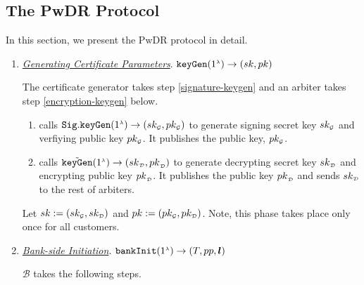 




\subsection{The PwDR Protocol}
In this section, we present the PwDR protocol in detail. 





\begin{enumerate}

\item \underline{\textit{Generating  Certificate Parameters}}.  $\mathtt{keyGen}(1^{\scriptscriptstyle \lambda})\rightarrow (sk,pk)$

The certificate generator  takes   step \ref{signature-keygen} and an arbiter takes step \ref{encryption-keygen} below. 

\begin{enumerate}
\item\label{signature-keygen} calls $\mathtt{Sig.keyGen}(1^{\scriptscriptstyle \lambda})\rightarrow (sk_{\scriptscriptstyle\mathcal{G}}, pk_{\scriptscriptstyle\mathcal{G}})$ to generate  signing secret key $sk_{\scriptscriptstyle\mathcal{G}}$ and  verfiying public key $pk_{\scriptscriptstyle\mathcal{G}}$. It publishes the public key, $pk_{\scriptscriptstyle\mathcal{G}}$.
%
\item\label{encryption-keygen} calls $\tilde{\mathtt{keyGen}}(1^{\scriptscriptstyle\lambda})\rightarrow({sk}_{\scriptscriptstyle\mathcal {D}}, {pk}_{\scriptscriptstyle\mathcal {D}})$ to generate  decrypting secret key ${sk}_{\scriptscriptstyle\mathcal {D}}$ and encrypting public key ${pk}_{\scriptscriptstyle\mathcal {D}}$. It publishes the public key ${pk}_{\scriptscriptstyle\mathcal {D}}$ and sends ${sk}_{\scriptscriptstyle\mathcal {D}}$ to the rest of arbiters.
\end{enumerate}


Let $sk:=(sk_{\scriptscriptstyle\mathcal{G}}, sk_{\scriptscriptstyle\mathcal{D}})$ and $pk:=(pk_{\scriptscriptstyle\mathcal{G}}, pk_{\scriptscriptstyle\mathcal{D}})$. Note, this   phase takes place only once for all customers.
\vspace{2mm}
\item\label{RCPoRP::Bank-side-Initiation} \underline{\textit{Bank-side Initiation}}. $\mathtt{bankInit}(1^{\scriptscriptstyle \lambda})\rightarrow (T, pp, \bm l)$

$\mathcal{B}$ takes the following steps. 
\begin{enumerate}


\end{enumerate}
\end{enumerate}
